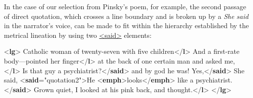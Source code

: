 In the case of our selection from Pinsky's poem, for example, the second passage of direct quotation, which crosses a line boundary and is broken up by a \textit{She said} in the narrator's voice, can be made to fit within the hierarchy established by the metrical lineation by using two \hyperref[TEI.said]{<said>} elements: \par\bgroup{}\exampleFont \begin{shaded}\noindent\mbox{}{<\textbf{lg}>}\mbox{}\newline 
{}Catholic woman of twenty-seven with five children{</\textbf{l}>}\mbox{}\newline 
{}And a first-rate body—pointed her finger{</\textbf{l}>}\mbox{}\newline 
{}at the back of one certain man and asked me,{</\textbf{l}>}\mbox{}\newline 
{}\mbox{}\newline 
\hspace*{1em}Is that guy a psychiatrist?{</\textbf{said}>} and by god he was!\mbox{}\newline 
{}Yes,{</\textbf{said}>}\mbox{}\newline 
{}\mbox{}\newline 
{}She said, {<\textbf{said}\hspace*{1em}{n}="{quotation2}">}He {<\textbf{emph}>}looks{</\textbf{emph}>} like a\mbox{}\newline 
\hspace*{1em}\hspace*{1em}\hspace*{1em}\hspace*{1em} psychiatrist.{</\textbf{said}>}\mbox{}\newline 
{}\mbox{}\newline 
{}Grown quiet, I looked at his pink back, and thought.{</\textbf{l}>}\mbox{}\newline 
{</\textbf{lg}>}\end{shaded}\egroup\par \par
